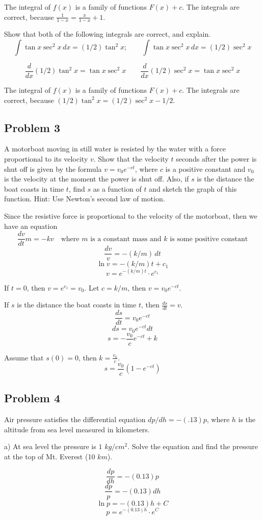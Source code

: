 \documentclass{article}
\begin{document}
\par The integral of $f(x)$ is a family of functions $F(x) + c$. The integrals are correct, because $\frac{1}{1-x} = \frac{x}{1-x} + 1$.

\begin{tcolorbox}
    Show that both of the following integrals are correct, and explain.
    \[ \int{\tan{x}\sec^2{x} \, dx} = (1/2)\tan^2{x}; \quad  \quad \int{\tan{x}\sec^2{x} \, dx} = (1/2)\sec^2{x} \]
\end{tcolorbox}
\[ \frac{d}{dx}(1/2)\tan^2{x} = \tan{x}\sec^2{x} \quad \quad \frac{d}{dx}(1/2)\sec^2{x} = \tan{x}\sec^2{x} \]
\par The integral of $f(x)$ is a family of functions $F(x) + c$. The integrals are correct, because $(1/2)\tan^2{x} = (1/2)\sec^2{x} - 1/2$.


\subsection{Problem 3}
\begin{tcolorbox}
    A motorboat moving in still water is resisted by the water with a force proportional to its velocity $v$. Show that the velocity $t$ seconds after the power is shut off is given by the formula $v = v_0e^{-ct}$, where $c$ is a positive constant and $v_0$ is the velocity at the moment the power is shut off. Also, if $s$ is the distance the boat coasts in time $t$, find $s$ as a function of $t$ and sketch the graph of this function. Hint: Use Newton's second law of motion.
\end{tcolorbox}
Since the resistive force is proportional to the velocity of the motorboat, then we have an equation
\[ \frac{dv}{dt}m = -kv \quad \text{where $m$ is a constant mass and $k$ is some positive constant} \]
\[ \frac{dv}{v} = -(k/m) \, dt \]
\[ \ln{v} = -(k/m)t + c_1 \]
\[ v = e^{-(k/m)t} \cdot e^{c_1} \]
\par If $t = 0$, then $v = e^{c_1} = v_0$. Let $c = k/m$, then $v = v_0e^{-ct}$. \\
\par If $s$ is the distance the boat coasts in time $t$, then $\frac{ds}{dt} = v$.
\[ \frac{ds}{dt} = v_0e^{-ct} \]
\[ ds = v_0e^{-ct}dt \]
\[ s = -\frac{v_0}{c}e^{-ct}+k \]

\par Assume that $s(0) = 0$, then $k = \frac{v_0}{c}$.
\[ s = \frac{v_0}{c}\left( 1 - e^{-ct} \right) \]

\subsection{Problem 4}
\begin{tcolorbox}
    Air pressure satisfies the differential equation $dp/dh = -(.13)p$, where $h$ is the altitude from sea level measured in kilometers. \\
    \par a) At sea level the pressure is $1$ $kg/cm^2$. Solve the equation and find the pressure at the top of Mt. Everest (10 $km$). 
\end{tcolorbox}
\[ \frac{dp}{dh} = -(0.13)p \]
\[ \frac{dp}{p} = -(0.13)dh \]
\[ \ln{p} = -(0.13)h + C \]
\[ p = e^{-(0.13)h} \cdot e^C \]
\end{document}
